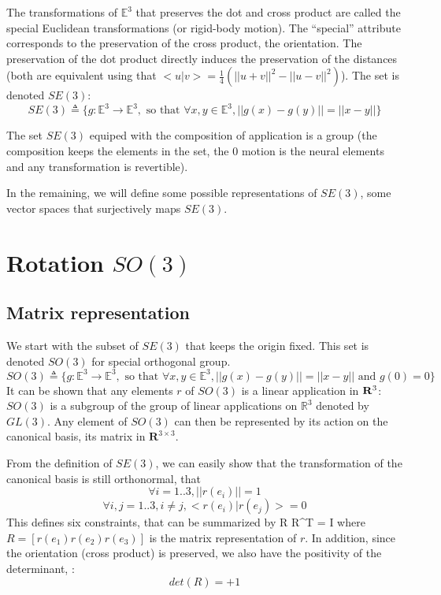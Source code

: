 \documentclass{book}
\begin{document}
The transformations of $\mathbb{E}^3$ that preserves the dot and cross product are called the special Euclidean transformations (or rigid-body motion). The ``special'' attribute corresponds to the preservation of the cross product, \mie the orientation. The preservation of the dot product directly induces the preservation of the distances (both are equivalent using that $<u|v> = \frac{1}{4} ( ||u+v||^2 - ||u-v||^2)$). The set is denoted $SE(3)$:
\[ SE(3) \triangleq \Big\{ g : \mathbb{E}^3 \rightarrow \mathbb{E}^3, \textrm{ so that } \forall x,y \in \mathbb{E}^3, || g(x) - g(y) || = ||x - y|| \Big\} \]

The set $SE(3)$ equiped with the composition of application is a group (\mie the composition keeps the elements in the set, the 0 motion is the neural elements and any transformation is revertible). 

In the remaining, we will define some possible representations of $SE(3)$, \mie some vector spaces that surjectively maps $SE(3)$.


\section{Rotation $SO(3)$}

\subsection{Matrix representation}
We start with the subset of $SE(3)$ that keeps the origin fixed. This set is denoted $SO(3)$ for special orthogonal group. 
\[ SO(3) \triangleq \Big\{ g : \mathbb{E}^3 \rightarrow \mathbb{E}^3, \textrm{ so that } \forall x,y \in \mathbb{E}^3, || g(x) - g(y) || = ||x - y|| \textrm{ and } g(0) = 0 \Big\} \]
It can be shown that any elements $r$ of $SO(3)$ is a linear application in $\mathbf{R}^3$: $SO(3)$ is a subgroup of the group of linear applications on $\mathbb{R}^3$ denoted by $GL(3)$. Any element of $SO(3)$ can then be represented by its action on the canonical basis, \mie its matrix in $\mathbf{R}^{3\times 3}$.

From the definition of $SE(3)$, we can easily show that the transformation of the canonical basis is still orthonormal, \mie that
\[ \forall i = 1..3, || r(e_i) || = 1 \]
\[ \forall i,j=1..3, i \neq j,  <r(e_i)|r(e_j)> = 0 \]
This defines six constraints, that can be summarized by 
 R R^T = I \EOUT
where $R = [ r(e_1) r(e_2) r(e_3) ]$ is the matrix representation of $r$. In addition, since the orientation (cross product) is preserved, we also have the positivity of the determinant, \mie:
\[ det(R) = +1\]
\end{document}
